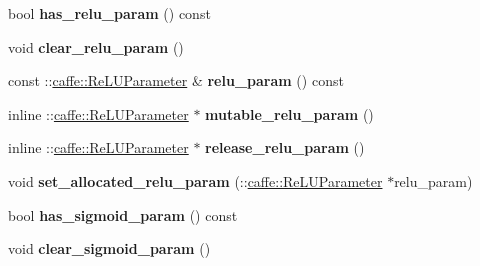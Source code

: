 \begin{DoxyCompactItemize}
\item 
\mbox{\label{classcaffe_1_1_v1_layer_parameter_ae06c8a3112ae43e7d6c1331a9b905753}} 
bool {\bfseries has\+\_\+relu\+\_\+param} () const
\item 
\mbox{\label{classcaffe_1_1_v1_layer_parameter_a465403643d6e9b35dd35ef9ef4fe8b89}} 
void {\bfseries clear\+\_\+relu\+\_\+param} ()
\item 
\mbox{\label{classcaffe_1_1_v1_layer_parameter_a8e1bd753d0034f8768b413bdcc351fe5}} 
const \+::\mbox{\hyperlink{classcaffe_1_1_re_l_u_parameter}{caffe\+::\+Re\+L\+U\+Parameter}} \& {\bfseries relu\+\_\+param} () const
\item 
\mbox{\label{classcaffe_1_1_v1_layer_parameter_af3123cc51d01d10d3b555ee0bd5dc8af}} 
inline \+::\mbox{\hyperlink{classcaffe_1_1_re_l_u_parameter}{caffe\+::\+Re\+L\+U\+Parameter}} $\ast$ {\bfseries mutable\+\_\+relu\+\_\+param} ()
\item 
\mbox{\label{classcaffe_1_1_v1_layer_parameter_a96f3129c4997e9c806e6a54bc20b2e34}} 
inline \+::\mbox{\hyperlink{classcaffe_1_1_re_l_u_parameter}{caffe\+::\+Re\+L\+U\+Parameter}} $\ast$ {\bfseries release\+\_\+relu\+\_\+param} ()
\item 
\mbox{\label{classcaffe_1_1_v1_layer_parameter_a10dd0a956f6bb751c24b56bbf4c2b222}} 
void {\bfseries set\+\_\+allocated\+\_\+relu\+\_\+param} (\+::\mbox{\hyperlink{classcaffe_1_1_re_l_u_parameter}{caffe\+::\+Re\+L\+U\+Parameter}} $\ast$relu\+\_\+param)
\item 
\mbox{\label{classcaffe_1_1_v1_layer_parameter_ad4454e1c5529065a7c9d822b6cc79450}} 
bool {\bfseries has\+\_\+sigmoid\+\_\+param} () const
\item 
\mbox{\label{classcaffe_1_1_v1_layer_parameter_a7cbfbf79f5418aa366b29feccb12d963}} 
void {\bfseries clear\+\_\+sigmoid\+\_\+param} ()
\item 
\mbox{\label{classcaffe_1_1_v1_layer_parameter_a31ca437b4dbe53da975edda2682205b1}} 

\end{DoxyCompactItemize}
